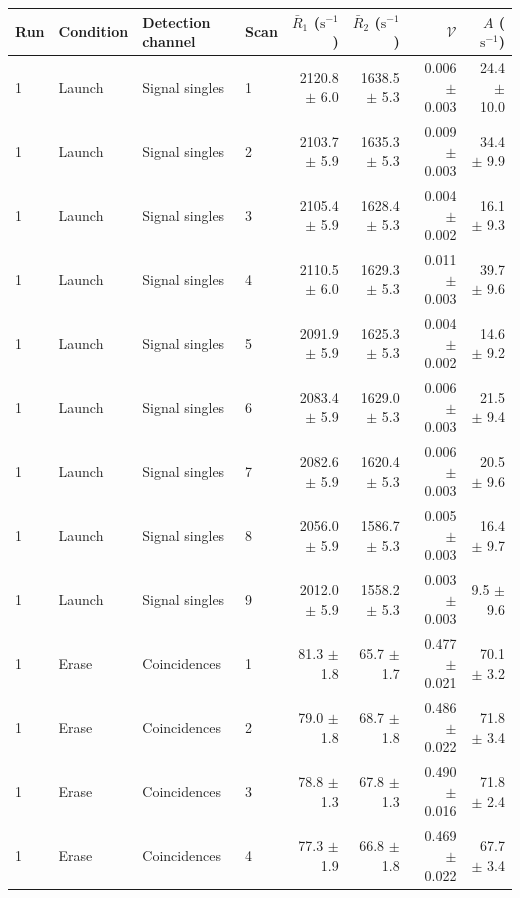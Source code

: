 \begin{tabular}{llllrrrr}
\toprule
Run & Condition & Detection channel & Scan & $\bar R_1$ ($\mathrm{s}^{-1}$) & $\bar R_2$ ($\mathrm{s}^{-1}$) & $\mathcal{V}$ & $A$ ($\mathrm{s}^{-1}$) \\
\midrule
1 & Launch & Signal singles & 1 & 2120.8 \ensuremath{\pm} 6.0 & 1638.5 \ensuremath{\pm} 5.3 & 0.006 \ensuremath{\pm} 0.003 & 24.4 \ensuremath{\pm} 10.0 \\
1 & Launch & Signal singles & 2 & 2103.7 \ensuremath{\pm} 5.9 & 1635.3 \ensuremath{\pm} 5.3 & 0.009 \ensuremath{\pm} 0.003 & 34.4 \ensuremath{\pm} 9.9 \\
1 & Launch & Signal singles & 3 & 2105.4 \ensuremath{\pm} 5.9 & 1628.4 \ensuremath{\pm} 5.3 & 0.004 \ensuremath{\pm} 0.002 & 16.1 \ensuremath{\pm} 9.3 \\
1 & Launch & Signal singles & 4 & 2110.5 \ensuremath{\pm} 6.0 & 1629.3 \ensuremath{\pm} 5.3 & 0.011 \ensuremath{\pm} 0.003 & 39.7 \ensuremath{\pm} 9.6 \\
1 & Launch & Signal singles & 5 & 2091.9 \ensuremath{\pm} 5.9 & 1625.3 \ensuremath{\pm} 5.3 & 0.004 \ensuremath{\pm} 0.002 & 14.6 \ensuremath{\pm} 9.2 \\
1 & Launch & Signal singles & 6 & 2083.4 \ensuremath{\pm} 5.9 & 1629.0 \ensuremath{\pm} 5.3 & 0.006 \ensuremath{\pm} 0.003 & 21.5 \ensuremath{\pm} 9.4 \\
1 & Launch & Signal singles & 7 & 2082.6 \ensuremath{\pm} 5.9 & 1620.4 \ensuremath{\pm} 5.3 & 0.006 \ensuremath{\pm} 0.003 & 20.5 \ensuremath{\pm} 9.6 \\
1 & Launch & Signal singles & 8 & 2056.0 \ensuremath{\pm} 5.9 & 1586.7 \ensuremath{\pm} 5.3 & 0.005 \ensuremath{\pm} 0.003 & 16.4 \ensuremath{\pm} 9.7 \\
1 & Launch & Signal singles & 9 & 2012.0 \ensuremath{\pm} 5.9 & 1558.2 \ensuremath{\pm} 5.3 & 0.003 \ensuremath{\pm} 0.003 & 9.5 \ensuremath{\pm} 9.6 \\
\midrule
1 & Erase & Coincidences & 1 & 81.3 \ensuremath{\pm} 1.8 & 65.7 \ensuremath{\pm} 1.7 & 0.477 \ensuremath{\pm} 0.021 & 70.1 \ensuremath{\pm} 3.2 \\
1 & Erase & Coincidences & 2 & 79.0 \ensuremath{\pm} 1.8 & 68.7 \ensuremath{\pm} 1.8 & 0.486 \ensuremath{\pm} 0.022 & 71.8 \ensuremath{\pm} 3.4 \\
1 & Erase & Coincidences & 3 & 78.8 \ensuremath{\pm} 1.3 & 67.8 \ensuremath{\pm} 1.3 & 0.490 \ensuremath{\pm} 0.016 & 71.8 \ensuremath{\pm} 2.4 \\
1 & Erase & Coincidences & 4 & 77.3 \ensuremath{\pm} 1.9 & 66.8 \ensuremath{\pm} 1.8 & 0.469 \ensuremath{\pm} 0.022 & 67.7 \ensuremath{\pm} 3.4 \\

\end{tabular}
